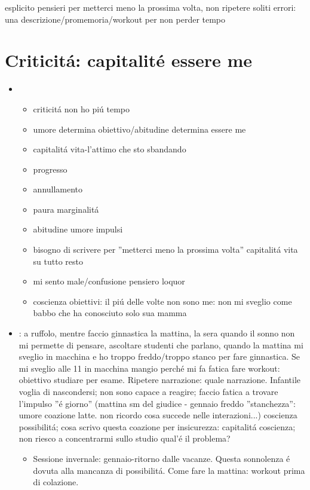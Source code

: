 \textcolor{ashgrey}{
esplicito pensieri per metterci meno la prossima volta, non ripetere soliti errori: una descrizione/promemoria/workout per non perder tempo
}
\listofworkouts

{\let\clearpage\relax
\chapter{Criticit\'a: capitalit\'e essere me}
}
\begin{itemize}
\item {} 
\begin{itemize}
\item criticit\'a non ho pi\'u tempo
\item umore determina obiettivo/abitudine determina essere me
\item capitalit\'a vita-l'attimo che sto sbandando
\item progresso
\item annullamento
\item paura marginalit\'a
\item abitudine umore impulsi
\item bisogno di scrivere per ''metterci meno la prossima volta'' capitalit\'a vita su tutto resto
\item mi sento male/confusione pensiero loquor 
\item coscienza obiettivi: il pi\'u delle volte non sono me: non mi sveglio come babbo che ha conosciuto solo sua mamma
\end{itemize}
\item {}: a ruffolo, mentre faccio ginnastica la mattina, la sera quando il sonno non mi permette di pensare, ascoltare studenti che parlano, quando la mattina mi sveglio in macchina e ho troppo freddo/troppo stanco per fare ginnastica. Se mi sveglio alle 11 in macchina mangio perch\'e mi fa fatica fare workout: obiettivo studiare per esame. Ripetere narrazione: quale narrazione.
Infantile voglia di nascondersi; non sono capace a reagire; faccio fatica a trovare l'impulso ''\'e giorno''
(mattina sm del giudice - gennaio freddo ''stanchezza'': umore coazione latte. non ricordo cosa succede nelle interazioni...)
coscienza possibilit\'a; cosa scrivo questa coazione per insicurezza: capitalit\'a coscienza; non riesco a concentrarmi sullo studio qual'\'e il problema?
\begin{itemize}
\item Sessione invernale: gennaio-ritorno dalle vacanze. Questa sonnolenza \'e dovuta alla mancanza di possibilit\'a. Come fare la mattina: workout prima di colazione.

\end{itemize}
\end{itemize}
